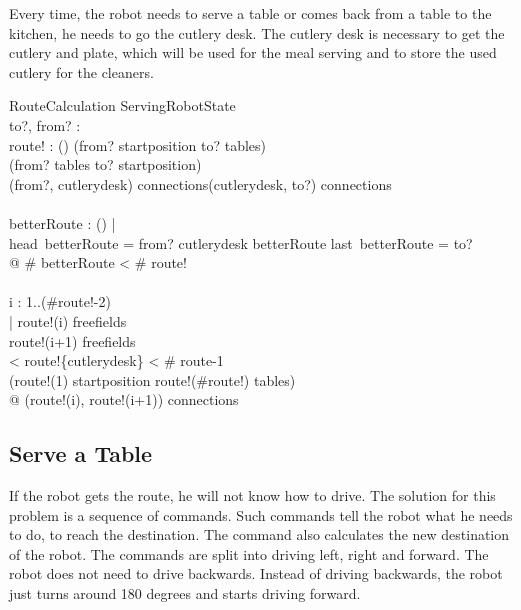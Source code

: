 \documentclass[11pt,a4paper]{article}
\begin{document}
Every time, the robot needs to serve a table or comes back from a table to the kitchen, he needs to go the cutlery desk. The cutlery desk is necessary to get the cutlery and plate, which will be used for the meal serving and to store the used cutlery for the cleaners.

\begin{schema}{RouteCalculation}
\Xi ServingRobotState\\
to?, from? : \nat \cross \nat\\
route! : \iseq (\nat \cross \nat)
\where
(from? \in \dom startposition \land to? \in \dom tables)\\
\hspace{20pt}\lor (from? \in \dom tables \land to? \in \dom startposition) \\
(from?, cutlerydesk) \in connections\plus \land (cutlerydesk, to?) \in connections\plus\\\\

\lnot \exists betterRoute : \iseq (\nat \cross \nat) | \\
\hspace{40pt} head~betterRoute = from? \land cutlerydesk \in betterRoute \land last~betterRoute = to?\\
\hspace{10pt} @ \# betterRoute < \# route!\\\\

  \forall i : 1..(\#route!-2)
  \\\hspace{20pt}| route!(i) \in \dom freefields
  \\\hspace{40pt} \land route!(i+1) \in \dom freefields
  \\\hspace{40pt}  < route!\inv \limg \{cutlerydesk\} \rimg < \# route-1
  \\\hspace{40pt} \land (route!(1) \in startposition \land route!(\#route!) \in \dom tables)
  \\\hspace{20pt}@ (route!(i), route!(i+1)) \in connections
\end{schema}

\subsection{Serve a Table}
If the robot gets the route, he will not know how to drive. The solution for this problem is a sequence of commands. Such commands tell the robot what he needs to do, to reach the destination. The command also calculates the new destination of the robot. The commands are split into driving left, right and forward. The robot does not need to drive backwards. Instead of driving backwards, the robot just turns around 180 degrees and starts driving forward.
\end{document}

